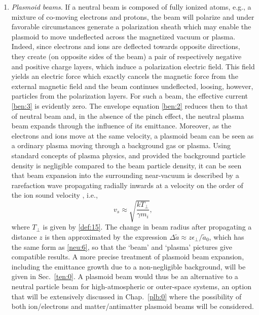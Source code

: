 \documentclass [12pt,a4paper,     ]{report} %
\begin{document}
\begin{enumerate}
\item \emph{Plasmoid beams.}  If a neutral beam is composed of fully ionized atoms, e.g., a mixture of co-moving electrons and protons, the beam will polarize and under favorable circumstances generate a polarization sheath which may enable the plasmoid to move undeflected across the magnetized vacuum or plasma.   Indeed, since electrons and ions are deflected towards opposite directions, they create (on opposite sides of the beam) a pair of respectively negative and positive charge layers, which induce a polarization electric field.  This field yields an electric force which exactly cancels the magnetic force from the external magnetic field and the beam continues undeflected, loosing, however, particles from the polarization layers.  For such a beam, the effective current \eqref{ben:3} is evidently zero.  The envelope equation \eqref{ben:2} reduces then to that of neutral beam and, in the absence of the pinch effect, the neutral plasma beam expands through the influence of its emittance.  Moreover, as the electrons and ions move at the same velocity, a plasmoid beam can be seen as a ordinary plasma moving through a background gas or plasma.  Using standard concepts of plasma physics, and provided the background particle density is negligible compared to the beam particle density, it can be seen that beam expansion into the surrounding near-vacuum is described by a rarefaction wave propagating radially inwards at a velocity on the order of the ion sound velocity \cite{DENAV1979-}, i.e.,
%
\begin{equation}\label{mag:10} %
	          v_s \approx \sqrt{ \frac{kT_{\perp}}{\gamma m_i} }, 
\end{equation}
%
where $T_{\perp}$ is given by \eqref{def:15}.  The change in beam radius after propagating a distance $z$ is then approximated by the expression $\Delta \tilde{a} \approx z \epsilon_{\perp} /\tilde{a}_0$, which has the same form as \eqref{neu:6}, so that the `beam' and `plasma' pictures give compatible results.  A more precise  treatment of plasmoid beam expansion, including the emittance growth due to a non-negligible background, will be given in Sec.~\ref{ten:0}.  A plasmoid beam would thus be an alternative to a neutral particle beam for high-atmospheric or outer-space systems, an option that will be extensively discussed in Chap.~\ref{plb:0} where the possibility of both ion/electrons and matter/antimatter plasmoid beams will be considered.


\end{enumerate}
\end{document}
